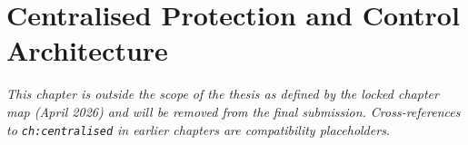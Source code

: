 \chapter{Centralised Protection and Control Architecture}
\label{ch:centralised}

\emph{This chapter is outside the scope of the thesis as defined by the locked
chapter map (April 2026) and will be removed from the final submission.
Cross-references to \texttt{ch:centralised} in earlier chapters are
compatibility placeholders.}
